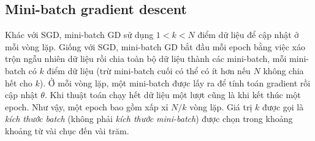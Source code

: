  
 
 
 
 
 
\subsection{Mini-batch gradient descent}
Khác với SGD, mini-batch GD sử dụng $1 < k < N$ điểm dữ liệu để cập nhật ở mỗi
vòng lặp. Giống với SGD, mini-batch GD bắt đầu mỗi epoch bằng việc xáo trộn ngẫu
nhiên dữ liệu rồi chia toàn bộ dữ liệu thành các {mini-batch}, mỗi {mini-batch}
có $k$ điểm dữ liệu (trừ mini-batch cuối có thể có ít hơn nếu $N$ không chia hết
cho $k$). Ở mỗi vòng lặp, một mini-batch được lấy ra để tính toán gradient rồi
cập nhật $\theta$. Khi thuật toán chạy hết dữ liệu một lượt cũng là khi kết thúc
một epoch. Như vậy, {một epoch} bao gồm xấp xỉ $N/k$ vòng lặp. Giá trị $k$ được
gọi là \textit{kích thước batch} (không phải \textit{kích thước mini-batch}) được chọn trong khoảng khoảng từ vài chục đến vài trăm.
 
